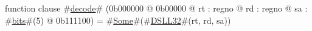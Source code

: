 function clause #\hyperref[zdecode]{decode}# (0b000000 @ 0b00000 @ rt : regno @ rd : regno @ sa : #\hyperref[zbits]{bits}#(5) @ 0b111100) =
  #\hyperref[zSome]{Some}#(#\hyperref[zDSLLthreetwo]{DSLL32}#(rt, rd, sa))
